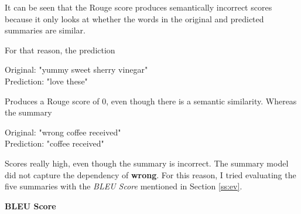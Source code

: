 It can be seen that the Rouge score produces semantically incorrect scores because it only looks at whether the words in the original and predicted summaries are similar. 

For that reason, the prediction 

\begin{tcolorbox}
	Original: "yummy sweet sherry vinegar" \\
	Prediction: "love these"
\end{tcolorbox}

Produces a Rouge score of 0, even though there is a semantic similarity. Whereas the summary

\begin{tcolorbox}
	Original: "wrong coffee received" \\
	Prediction: "coffee received"
\end{tcolorbox}

Scores really high, even though the summary is incorrect. The summary model did not capture the dependency of \textbf{wrong}. For this reason, I tried evaluating the five summaries with the \textit{BLEU Score} mentioned in Section \ref{ss:ev}.

\textbf{BLEU Score}


